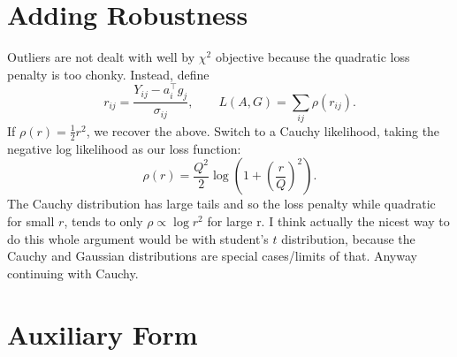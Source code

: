 \documentclass[11pt]{article}
\begin{document}
\section*{Adding Robustness}

Outliers are not dealt with well by $\chi^2$ objective because the quadratic loss penalty is too chonky.
Instead, define
\begin{equation}
    r_{ij} = \frac{Y_{ij} - a_i^\top g_j}{\sigma_{ij}}, \qquad 
    L(A,G) = \sum_{ij} \rho(r_{ij}).
\end{equation}
If $\rho(r) = \tfrac{1}{2} r^2$, we recover the above. 
Switch to a Cauchy likelihood, taking the negative log likelihood as our loss function:
\begin{equation}
    \rho(r) = \frac{Q^2}{2} \log\!\left(1 + \left(\frac{r}{Q}\right)^2\right).
\end{equation}
The Cauchy distribution has large tails and so the loss penalty while quadratic for small $r$, tends to only $\rho \propto \log{r^2}$ for large r.
I think actually the nicest way to do this whole argument would be with student's $t$ distribution, because the Cauchy and Gaussian distributions are special cases/limits of that.
Anyway continuing with Cauchy.

\section*{Auxiliary Form}
\end{document}
